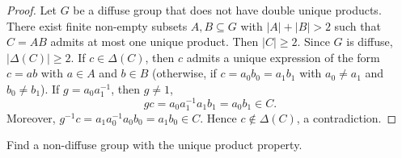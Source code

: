\begin{optional}
\begin{proof}
    Let $G$ be a diffuse group that does not have double unique products. 
    There exist finite non-empty subsets $A,B\subseteq G$ with $|A|+|B|>2$ such that 
	$C=AB$ admits at most one unique product. Then $|C|\geq2$. Since $G$ is diffuse, 
	$|\Delta(C)|\geq2$. If $c\in\Delta(C)$, then $c$ admits a unique 
	expression of the form $c=ab$ with $a\in A$ and $b\in B$ (otherwise, if 
	$c=a_0b_0=a_1b_1$ with $a_0\ne a_1$ and $b_0\ne b_1$). If $g=a_0a_1^{-1}$,
	then $g\ne 1$, 
	\[
	gc=a_0a_1^{-1}a_1b_1=a_0b_1\in C.
	\]
	Moreover, 
	$g^{-1}c=a_1a_0^{-1}a_0b_0=a_1b_0\in C$. Hence $c\not\in\Delta(C)$, a contradiction.
\end{proof}

\begin{open}
	Find a non-diffuse group with the unique product property.
\end{open}

%
%
%
%
%
%
%
%	
\end{optional}


